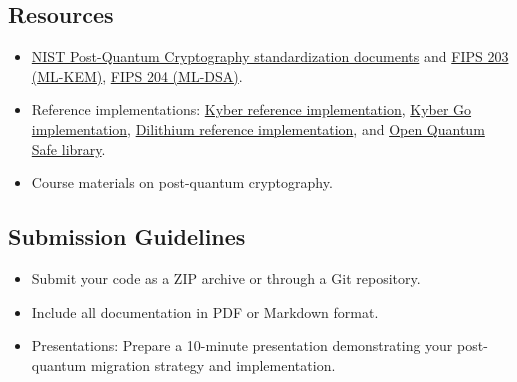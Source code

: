 \documentclass[10pt,a4paper,american]{article}
\begin{document}
\subsection*{Resources}
\begin{itemize}
	\item \href{https://csrc.nist.gov/projects/post-quantum-cryptography/post-quantum-cryptography-standardization}{NIST Post-Quantum Cryptography standardization documents} and \href{https://nvlpubs.nist.gov/nistpubs/FIPS/NIST.FIPS.203.pdf}{FIPS 203 (ML-KEM)}, \href{https://nvlpubs.nist.gov/nistpubs/FIPS/NIST.FIPS.204.pdf}{FIPS 204 (ML-DSA)}.
	\item Reference implementations: \href{https://github.com/pq-crystals/kyber}{Kyber reference implementation}, \href{https://github.com/symbolicsoft/kyber-k2so}{Kyber Go implementation}, \href{https://github.com/pq-crystals/dilithium}{Dilithium reference implementation}, and \href{https://github.com/open-quantum-safe/liboqs}{Open Quantum Safe library}.
	\item Course materials on post-quantum cryptography.
\end{itemize}

\subsection*{Submission Guidelines}
\begin{itemize}
	\item Submit your code as a ZIP archive or through a Git repository.
	\item Include all documentation in PDF or Markdown format.
	\item Presentations: Prepare a 10-minute presentation demonstrating your post-quantum migration strategy and implementation.
\end{itemize}
\end{document}
